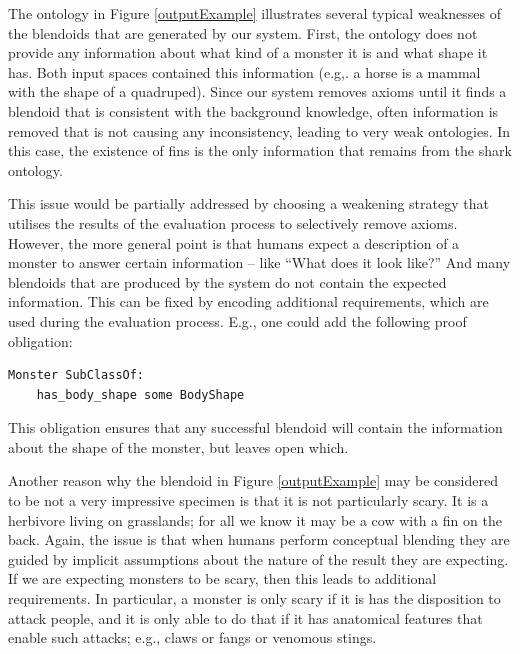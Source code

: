 \documentclass{ecai2012}
\begin{document}
The ontology in Figure \ref{outputExample} illustrates several typical weaknesses 
of the blendoids that are generated by our system.
 First, the ontology does not provide any information about what kind of a monster it is 
 and what shape it has. Both input spaces contained this information 
 (e.g,. a horse is a  mammal with the shape of a quadruped). 
Since our system removes axioms until it finds a blendoid that is consistent with the background knowledge,
often information is removed that is not causing any inconsistency, leading to  very weak ontologies.  In this case, the existence of fins is the only
information that remains from the shark ontology.

This issue would be partially addressed by choosing  a weakening strategy 
that utilises the results of the evaluation process to selectively remove axioms. 
However, the more general point is that humans expect a description of a monster to answer certain information -- like ``What does it look like?'' 
And many blendoids that are produced by the system  do not contain the expected information.
This can be fixed by encoding additional requirements, 
which are used during the evaluation process. E.g., one could add the following proof obligation: 
\begin{lstlisting}[basicstyle=\ttfamily\scriptsize,language=dolText,morekeywords={props,excluding,ObjectProperty,
Class,DisjointUnionOf,SubClassOf,Characteristics,Transitive,Asymmetric,SubPropertyOf,
DisjointClasses,EquivalentTo,Asymmetric,inverse,only,forall,iff,if,or,exists,
bridge,distributed},escapechar=@,mathescape,alsolanguage=owl2Manchester]
Monster SubClassOf:
    has_body_shape some BodyShape
\end{lstlisting}
This obligation ensures that any successful blendoid will contain the information about the shape of the monster, but leaves open which. 

Another reason why the blendoid in Figure \ref{outputExample} may 
be considered to be not a very impressive specimen is that it is not particularly
scary. It is a herbivore living on grasslands; for all we know it may
be a cow with a fin on the back. Again, the issue is that when humans
perform conceptual blending they are guided by implicit assumptions 
about the nature of the result they are expecting. If we are
expecting monsters to be scary, then this leads to additional requirements.
In particular, a monster is only scary if it is has the disposition to
attack people, and it is only able to do that if it has anatomical
features that enable such attacks; e.g., claws or fangs or venomous stings. 
 
\end{document}

